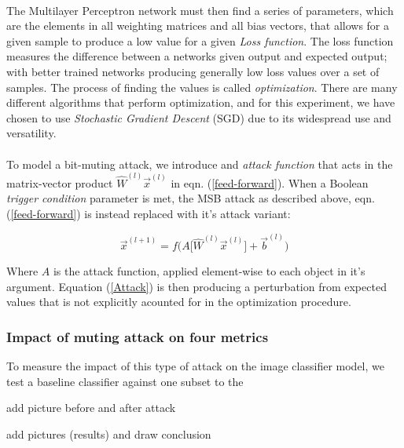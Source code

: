 \documentclass[12pt,letterpaper]{article}
\begin{document}
\paragraph*{}The Multilayer Perceptron network must then find a series of parameters, which are the elements in all weighting matrices and all bias vectors, that allows for a given sample to produce a low value for a given \textit{Loss function}. The loss function measures the difference between a networks given output and expected output; with better trained networks producing generally low loss values over a set of samples. The process of finding the values is called \textit{optimization}. There are many different algorithms that perform optimization, and for this experiment, we have chosen to use \textit{Stochastic Gradient Descent} (SGD) due to its widespread use and versatility.

\paragraph*{}To model a bit-muting attack, we introduce and \textit{attack function} that acts in the matrix-vector product 
$\hat{W}^{(l)} \vec{x}^{(l)}$ in eqn. (\ref{feed-forward}). When a Boolean \textit{trigger condition} parameter is met, the MSB attack as described above, eqn. (\ref{feed-forward}) is instead replaced with it's attack variant:

\begin{equation}
\label{Attack}
\vec{x}^{(l+1)} = f \Big( A \big[ \hat{W}^{(l)} \vec{x}^{(l)} \big] + \vec{b}^{(l)} \Big)
\end{equation}

Where $A$ is the attack function, applied element-wise to each object in it's argument. Equation (\ref{Attack}) is then producing a perturbation from expected values that is not explicitly acounted for in the optimization procedure.

\subsubsection{Impact of muting attack on four metrics}

To measure the impact of this type of attack on the image classifier model, we test a baseline classifier against one subset to the 

add picture before and after attack


add pictures (results) and draw conclusion
\end{document}

